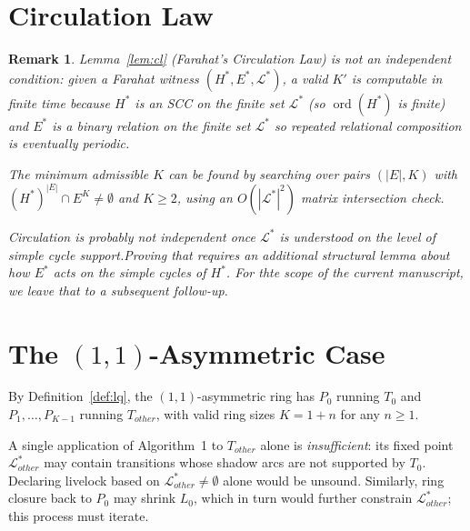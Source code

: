 \documentclass{article}
\newtheorem{remark}{Remark}
\newcommand{\Ls}{\mathcal{L}^{*}}
\newcommand{\Hstar}{H^{*}}
\newcommand{\Estar}{E^{*}}
\DeclareMathOperator{\ord}{ord}
\begin{document}
\section{Circulation Law}

\begin{remark}
Lemma~\ref{lem:cl} (Farahat's Circulation Law) is not an independent
condition: given a Farahat witness $(\Hstar,\Estar,\Ls)$, a valid $K'$
is computable in finite time because $\Hstar$ is an SCC on the finite
set $\Ls$ (so $\ord(\Hstar)$ is finite) and $\Estar$ is a binary relation on the finite set $\Ls$ so repeated relational composition is eventually periodic.

The minimum admissible $K$ can be found by searching over pairs
$(|E|,K)$ with $(\Hstar)^{|E|}\cap E^K\neq\emptyset$ and $K\geq 2$,
using an $O(|\Ls|^2)$ matrix intersection check.

 Circulation is probably not independent once $\Ls$ is understood on the level of simple cycle support.Proving that requires an additional structural lemma about how $\Estar$ acts on the simple cycles of $\Hstar$. For thte scope of the current manuscript, we leave that to a subsequent follow-up.
\end{remark}

\section{The $(1,1)$-Asymmetric Case}

By Definition~\ref{def:lq}, the $(1,1)$-asymmetric ring has $P_0$
running $T_0$ and $P_1,\ldots,P_{K-1}$ running $T_{\mathit{other}}$,
with valid ring sizes $K = 1+n$ for any $n\geq 1$.

A single application of Algorithm~1 to $T_{\mathit{other}}$ alone is
\emph{insufficient}: its fixed point $\Ls_{\mathit{other}}$ may contain
transitions whose shadow arcs are not supported by $T_0$.  Declaring
livelock based on $\Ls_{\mathit{other}}\neq\emptyset$ alone would be
unsound. Similarly, ring closure back to $P_0$ may shrink $L_0$, which
in turn would further constrain $\Ls_{\mathit{other}}$; this process
must iterate.
\end{document}

